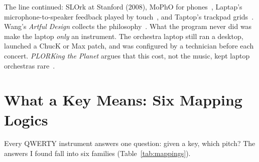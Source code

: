 \documentclass[10pt,letterpaper,twocolumn]{article}
\begin{document}
The line continued: SLOrk at Stanford (2008), MoPhO for phones~\citep{wang2008mopho}, Laptap's microphone-to-speaker feedback played by touch~\citep{nime2013laptap}, and Taptop's trackpad grids~\citep{nime2019tops}. Wang's \emph{Artful Design} collects the philosophy~\citep{wang2018artful}. What the program never did was make the laptop \emph{only} an instrument. The orchestra laptop still ran a desktop, launched a ChucK or Max patch, and was configured by a technician before each concert. \emph{PLORKing the Planet} argues that this cost, not the music, kept laptop orchestras rare~\citep{scudder2026plork}.

\section{What a Key Means: Six Mapping Logics}

Every QWERTY instrument answers one question: given a key, which pitch? The answers I found fall into six families (Table~\ref{tab:mappings}).
\end{document}
